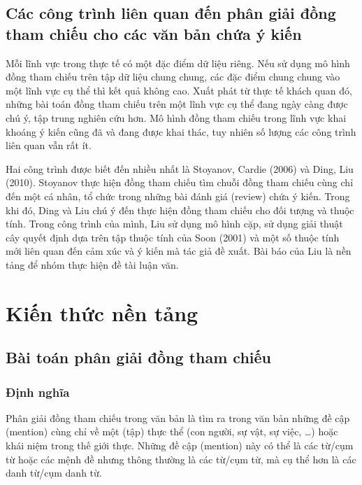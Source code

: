 \documentclass[12pt]{extarticle}
\begin{document}
		\subsection{Các công trình liên quan đến phân giải đồng tham chiếu cho các văn bản chứa ý kiến}
			\par Mỗi lĩnh vực trong thực tế có một đặc điểm dữ liệu riêng. Nếu sử dụng mô hình đồng tham chiếu trên tập dữ liệu chung chung, các đặc điểm chung chung vào một lĩnh vực cụ thể thì kết quả không cao. Xuất phát từ thực tế khách quan đó, những bài toán đồng tham chiếu trên một lĩnh vực cụ thể đang ngày càng được chú ý, tập trung nghiên cứu hơn. Mô hình đồng tham chiếu trong lĩnh vực khai khoáng ý kiến cũng đã và đang được khai thác, tuy nhiên số lượng các công trình liên quan vẫn rất ít. 
			\par Hai công trình được biết đến nhiều nhất là Stoyanov, Cardie (2006)\cite{stoyanov06} và Ding, Liu (2010)\cite{mainpaper}. Stoyanov thực hiện đồng tham chiếu tìm chuỗi đồng tham chiếu cùng chỉ đến một cá nhân, tổ chức trong những bài đánh giá (review) chứa ý kiến. Trong khi đó, Ding và Liu chú ý đến thực hiện đồng tham chiếu cho đối tượng và thuộc tính. Trong công trình của mình, Liu sử dụng mô hình cặp, sử dụng giải thuật cây quyết định dựa trên tập thuộc tính của Soon (2001)\cite{soon01} và một số thuộc tính mới liên quan đến cảm xúc và ý kiến mà tác giả đề xuất. Bài báo của Liu là nền tảng để nhóm thực hiện đề tài luận văn.

	\section{Kiến thức nền tảng}
		\subsection{Bài toán phân giải đồng tham chiếu}
			\label{coref_problem}
			\subsubsection*{Định nghĩa}
				Phân giải đồng tham chiếu trong văn bản là tìm ra trong văn bản những đề cập (mention) cùng chỉ về một (tập) thực thể (con người, sự vật, sự việc, …) hoặc khái niệm trong thế giới thực. Những đề cập (mention) này có thể là các từ/cụm từ hoặc các mệnh đề nhưng thông thường là các từ/cụm từ, mà cụ thể hơn là các danh từ/cụm danh từ.
\end{document}
